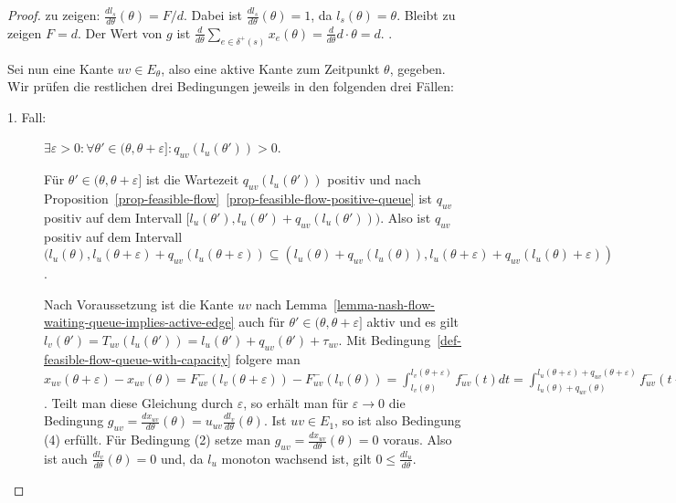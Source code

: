 \begin{proof}
	zu zeigen: $\frac{dl_s}{d\theta}(\theta) = F/d$.
	Dabei ist $\frac{dl_s}{d\theta}(\theta) = 1$, da $l_s(\theta) = \theta$. Bleibt zu zeigen $F= d$.
	Der Wert von $g$ ist $\frac{d}{d\theta}\sum_{e\in\delta^+(s)}x_e(\theta) = \frac{d}{d\theta} d\cdot\theta = d$. .
	
	Sei nun eine Kante $uv\in E_\theta$, also eine aktive Kante zum Zeitpunkt $\theta$, gegeben. Wir prüfen die restlichen drei Bedingungen jeweils in den folgenden drei Fällen:
	
	\begin{description}
		\item[1. Fall:] $\exists \varepsilon > 0:\forall \theta'\in (\theta, \theta + \varepsilon ] : q_{uv}(l_u(\theta')) > 0$.
		
		Für $\theta'\in(\theta,\theta+\varepsilon]$ ist die Wartezeit $q_{uv}(l_u(\theta'))$ positiv und nach Proposition~\ref{prop-feasible-flow}~\ref{prop-feasible-flow-positive-queue} ist $q_{uv}$ positiv auf dem Intervall $[ l_u(\theta')  , l_u(\theta')+q_{uv}(l_u(\theta')) )$.
		Also ist $q_{uv}$ positiv auf dem Intervall $( l_u(\theta) , l_u(\theta + \varepsilon) + q_{uv}(l_u(\theta + \varepsilon) )
		\subseteq ( l_u(\theta) + q_{uv}(l_u(\theta)) , l_u(\theta + \varepsilon) + q_{uv}(l_u(\theta) + \varepsilon ) )$.
		
		Nach Voraussetzung ist die Kante ${uv}$ nach Lemma~\ref{lemma-nash-flow-waiting-queue-implies-active-edge} auch für $\theta'\in  (\theta, \theta + \varepsilon ]$ aktiv und es gilt $l_v(\theta') = T_{uv}(l_u(\theta')) = l_u(\theta') + q_{uv}(\theta') + \tau_{uv}$.
		Mit Bedingung~\ref{def-feasible-flow-queue-with-capacity} folgere man $x_{uv}(\theta + \varepsilon) - x_{uv}(\theta) = F_{uv}^-(l_v(\theta + \varepsilon)) - F_{uv}^-(l_v(\theta))
		= \int_{l_v(\theta)}^{l_v(\theta + \varepsilon)} f_{uv}^-(t) dt
		= \int_{l_u(\theta) + q_{uv}(\theta)}^{l_u(\theta + \varepsilon) + q_{uv}(\theta + \varepsilon)} f_{uv}^-(t + \tau_{uv}) dt
		= u_{uv} (l_v(\theta + \varepsilon) - l_v(\theta))$.
		Teilt man diese Gleichung durch $\varepsilon$, so erhält man für $\varepsilon\rightarrow 0$ die Bedingung $g_{uv} = \frac{dx_{uv}}{d\theta}(\theta) = u_{uv} \frac{dl_v}{d\theta}(\theta)$.
		Ist $uv\in E_1$, so ist also Bedingung (4) erfüllt.
		Für Bedingung (2) setze man $g_{uv}=\frac{dx_{uv}}{d\theta}(\theta)=0$ voraus.
		Also ist auch $\frac{dl_v}{d\theta}(\theta)=0$ und, da $l_u$ monoton wachsend ist, gilt $0 \leq \frac{dl_u}{d\theta}$.


\end{description}
\end{proof}
